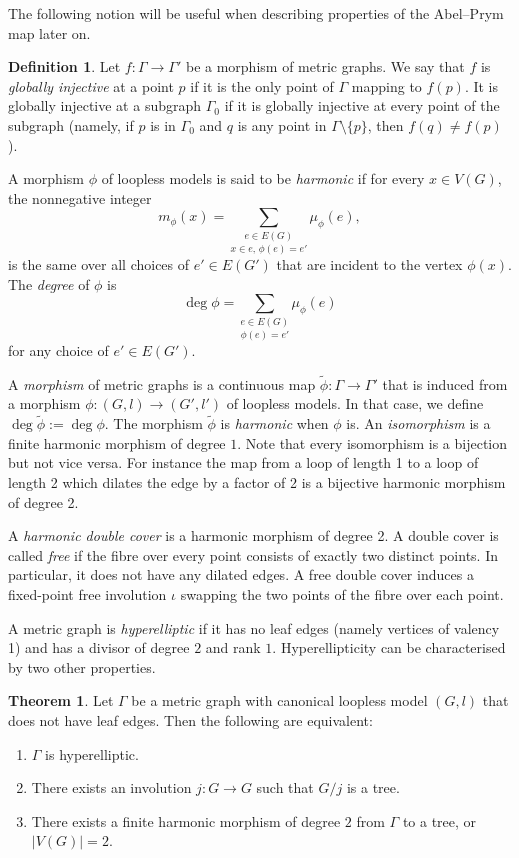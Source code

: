\documentclass[11pt]{article}
\theoremstyle{definition}
\newtheorem{defi}[theo]{Definition}
\numberwithin{equation}{section}
\newtheorem*{theorem*}{Theorem}
\theoremstyle{definition}
\newcommand{\Ga}{\Gamma}
\newcommand{\wt}[1]{\widetilde{#1}}
\begin{document}
The following notion will be useful when describing properties of the Abel--Prym map later on.


\begin{defi}\label{def:injectivity}
 Let $f:\Gamma\to\Gamma'$ be a morphism of metric graphs.  We say that $f$ is \emph{globally injective} at a point $p$ if it is the only point of $\Gamma$ mapping to $f(p)$. It is globally injective at a subgraph $\Gamma_0$  if it is globally injective at every point of the subgraph (namely, if $p$ is in $\Gamma_0$ and $q$ is any point in $\Gamma\setminus\{p\}$, then $f(q)\neq f(p)$). 
\end{defi}


A morphism $\phi$ of loopless models is said to be \emph{harmonic} if for every $x\in V(G)$, the nonnegative integer 
\[
m_{\phi}(x)=\underset{x\in e, \,\phi(e)=e'}{\sum_{e\in E(G)}}\mu_{\phi}(e),
\]
is the same over all choices of $e'\in E(G')$ that are incident to the vertex $\phi(x)$.
The \emph{degree} of $\phi$ is 
\[
\deg\phi=\underset{\phi(e)=e'}{\sum_{e\in E(G)}}\mu_{\phi}(e)
\]
for any choice of $e'\in E(G')$.


A \emph{morphism} of metric graphs is a continuous   map $\widetilde\phi\colon \Ga\to \Ga'$ that is induced from a morphism $\phi\colon (G,l)\to (G',l')$ of loopless models. In that case, we define  $\deg\widetilde\phi:= \deg\phi$. The morphism $\wt\phi$ is \emph{harmonic} when $\phi$ is. An \emph{isomorphism} is a finite harmonic morphism of degree $1$. Note that every isomorphism is a bijection but not vice versa. For instance the map from a loop of length 1 to a loop of length 2 which dilates the edge by a factor of 2 is a bijective harmonic morphism of degree 2.  

A \emph{harmonic double cover} is a harmonic morphism of degree 2.
A double cover is called \emph{free} if the fibre over every point consists of exactly two distinct points. In particular, it does not have any dilated edges. A free double cover  induces a fixed-point free involution $\iota$ swapping the two points of the fibre over each point. 

A metric graph is \emph{hyperelliptic} if it has no leaf edges (namely vertices of valency 1) and has a divisor of degree $2$ and rank $1$. Hyperellipticity can be characterised by two other properties. 


\begin{theorem*}\cite[Theorem 3.13]{CH}
Let $\Ga$ be a metric graph with canonical loopless model  $(G,l)$ that does not have leaf edges. Then the following are equivalent:
\begin{enumerate}
 \item $\Ga$ is hyperelliptic.
 \item There exists an involution $j\colon G\to G$ such that $G/j$ is a tree.
 \item There exists a finite harmonic morphism of degree $2$ from $\Gamma$ to a tree, or~$|V(G)|=2$.
\end{enumerate}
\end{theorem*}
\end{document}
